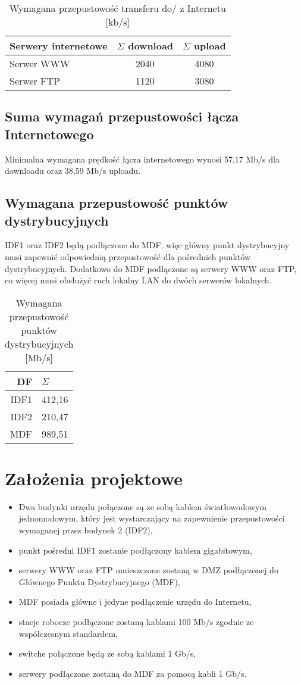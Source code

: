 \documentclass[12pt,a4paper]{article}
\begin{document}
	\begin{table}[H]
		\centering
		\begin{tabular}{l|c|c}
			Serwery internetowe&$\Sigma$ download&$\Sigma$ upload\\\hline
			Serwer WWW&2040&4080\\
			Serwer FTP&1120&3080\\
		\end{tabular}
		\caption{Wymagana przepustowość transferu do/ z Internetu [kb/s]}
	\end{table}

	\subsection{Suma wymagań przepustowości łącza Internetowego}

	Minimalna wymagana prędkość łącza internetowego wynosi 57,17 Mb/s dla downloadu oraz 38,59 Mb/s uploadu.
	
	\subsection{Wymagana przepustowość punktów dystrybucyjnych}
	
	IDF1 oraz IDF2 będą podłączone do MDF, więc główny punkt dystrybucyjny musi zapewnić odpowiednią przepustowość dla pośrednich punktów dystrybucyjnych. Dodatkowo do MDF podłączone są serwery WWW oraz FTP, co więcej musi obsłużyć ruch lokalny LAN do dwóch serwerów lokalnych.
	
	\begin{table}[H]
		\centering
		\begin{tabular}{r|l}
			DF & $\Sigma$\\\hline
			IDF1 & 412,16\\
			IDF2 & 210,47\\
			MDF & 989,51
		\end{tabular}
		\caption{Wymagana przepustowość punktów dystrybucyjnych [Mb/s]}
	\end{table}

	\section{Założenia projektowe}
	
	\begin{itemize}
		\item Dwa budynki urzędu połączone są ze sobą kablem światłowodowym jednomodowym, który jest wystarczający na zapewnienie przepustowości wymaganej przez budynek 2 (IDF2),
		\item punkt pośredni IDF1 zostanie podłączony kablem gigabitowym,
		\item serwery WWW oraz FTP umieszczone zostaną w DMZ podłączonej do Głównego Punktu Dystrybucyjnego (MDF),
		\item MDF posiada główne i jedyne podłączenie urzędu do Internetu,
		\item stacje robocze podłączone zostaną kablami 100 Mb/s zgodnie ze współczesnym standardem,
		\item switche połączone będą ze sobą kablami 1 Gb/s,
		\item serwery podłączone zostaną do MDF za pomocą kabli 1 Gb/s.
	\end{itemize}
	
\end{document}
